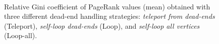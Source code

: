 \begin{figure}[hbtp]
  \centering
   \\[-2ex]
  \caption{Relative Gini coefficient of PageRank values (mean) obtained with three different dead-end handling strategies: \textit{teleport from dead-ends} (Teleport), \textit{self-loop dead-ends} (Loop), and \textit{self-loop all vertices} (Loop-all).}
  \label{fig:de-gini}
\end{figure}
